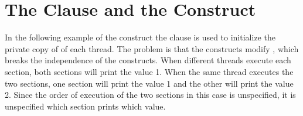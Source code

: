 \pagebreak
\chapter{The  Clause and the  Construct}
\label{chap:fpriv_sections}

In the following example of the  construct  the  
clause is used to initialize the private copy of  of each 
thread. The problem is that the  constructs modify , 
which breaks the independence of the  constructs. When different 
threads execute each section, both sections will print the value 1. When the same 
thread executes the two sections, one section will print the value 1 and the other 
will print the value 2. Since the order of execution of the two sections in this 
case is unspecified, it is unspecified which section prints which value. 




